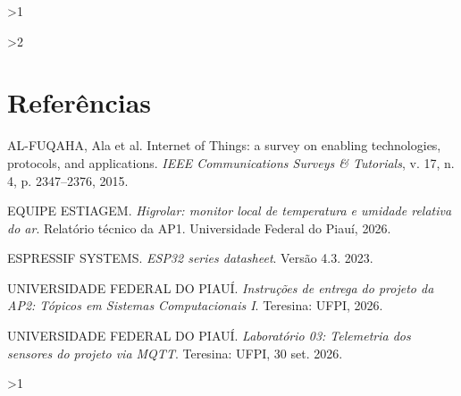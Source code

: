 \documentclass[
  12pt,
  oneside,
  a4paper,
  sumario=tradicional,
  english,
  brazil
]{abntex2}
\begin{document}
\frenchspacing

\pretextual

\imprimircapa
\imprimirfolhaderosto*



\listoffigures*
\cleardoublepage

\listoftables*
\cleardoublepage



\tableofcontents*
\cleardoublepage

\textual






\ifnum\value{ciclo}>1\relax
  
\fi

\ifnum\value{ciclo}>2\relax
  
\fi





\postextual

\chapter*{Referências}
\noindent AL-FUQAHA, Ala et al. Internet of Things: a survey on enabling technologies, protocols, and applications. \textit{IEEE Communications Surveys \& Tutorials}, v. 17, n. 4, p. 2347--2376, 2015.\par\medskip
\noindent EQUIPE ESTIAGEM. \textit{Higrolar: monitor local de temperatura e umidade relativa do ar}. Relatório técnico da AP1. Universidade Federal do Piauí, 2026.\par\medskip
\noindent ESPRESSIF SYSTEMS. \textit{ESP32 series datasheet}. Versão 4.3. 2023.\par\medskip
\noindent UNIVERSIDADE FEDERAL DO PIAUÍ. \textit{Instruções de entrega do projeto da AP2: Tópicos em Sistemas Computacionais I}. Teresina: UFPI, 2026.\par\medskip
\noindent UNIVERSIDADE FEDERAL DO PIAUÍ. \textit{Laboratório 03: Telemetria dos sensores do projeto via MQTT}. Teresina: UFPI, 30 set. 2026.\par

\begin{apendicesenv}
  \partapendices
  
  
  
  
  \ifnum\value{ciclo}>1\relax
    
    
  \fi
\end{apendicesenv}
\end{document}
